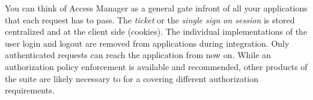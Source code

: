 You can think of Access Manager as a general gate infront of all your applications that each request has to pass. The \emph{ticket} or the \emph{single sign on session} is stored centralized and at the client side (cookies). The individual implementations of the user login and logout are removed from applications during integration. Only authenticated requests can reach the application from now on. While an authorization policy enforcement is available and recommended, other products of the suite are likely necessary to for a covering different authorization requirements.

